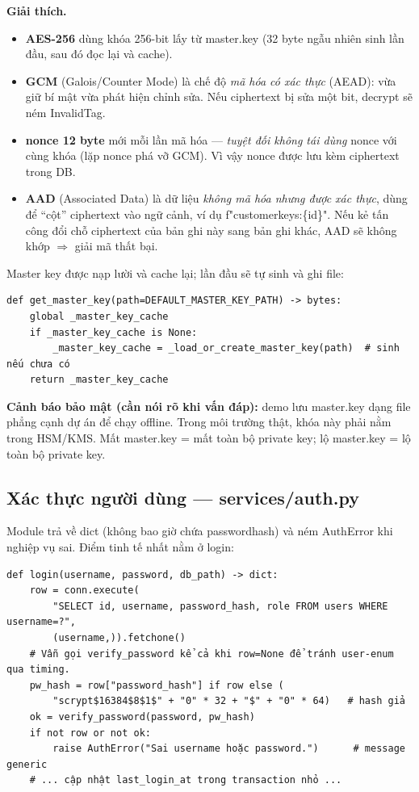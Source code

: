 \documentclass[12pt,a4paper]{article}
\newcommand{\code}[1]{{\ttfamily\small\def\_{\textunderscore\discretionary{}{}{}}#1}}
\begin{document}
\textbf{Giải thích.}
\begin{itemize}
  \item \textbf{AES-256} dùng khóa 256-bit lấy từ \code{master.key} (32 byte ngẫu
        nhiên sinh lần đầu, sau đó đọc lại và cache).
  \item \textbf{GCM} (Galois/Counter Mode) là chế độ \emph{mã hóa có xác thực}
        (AEAD): vừa giữ bí mật vừa phát hiện chỉnh sửa. Nếu ciphertext bị sửa một
        bit, \code{decrypt} sẽ ném \code{InvalidTag}.
  \item \textbf{nonce 12 byte} mới mỗi lần mã hóa — \emph{tuyệt đối không tái dùng}
        nonce với cùng khóa (lặp nonce phá vỡ GCM). Vì vậy nonce được lưu kèm
        ciphertext trong DB.
  \item \textbf{AAD} (Associated Data) là dữ liệu \emph{không mã hóa nhưng được
        xác thực}, dùng để ``cột'' ciphertext vào ngữ cảnh, ví dụ
        \code{f"customer\_keys:\{id\}"}. Nếu kẻ tấn công đổi chỗ ciphertext của
        bản ghi này sang bản ghi khác, AAD sẽ không khớp $\Rightarrow$ giải mã
        thất bại.
\end{itemize}

Master key được nạp lười và cache lại; lần đầu sẽ tự sinh và ghi file:

\begin{Verbatim}
def get_master_key(path=DEFAULT_MASTER_KEY_PATH) -> bytes:
    global _master_key_cache
    if _master_key_cache is None:
        _master_key_cache = _load_or_create_master_key(path)  # sinh nếu chưa có
    return _master_key_cache
\end{Verbatim}

\begin{warnbox}
\textbf{Cảnh báo bảo mật (cần nói rõ khi vấn đáp):} demo lưu \code{master.key}
dạng file phẳng cạnh dự án để chạy offline. Trong môi trường thật, khóa này phải
nằm trong HSM/KMS. Mất \code{master.key} = mất toàn bộ private key; lộ
\code{master.key} = lộ toàn bộ private key.
\end{warnbox}

\subsection{Xác thực người dùng — \code{services/auth.py}}

Module trả về \code{dict} (không bao giờ chứa \code{password\_hash}) và ném
\code{AuthError} khi nghiệp vụ sai. Điểm tinh tế nhất nằm ở \code{login}:

\begin{Verbatim}
def login(username, password, db_path) -> dict:
    row = conn.execute(
        "SELECT id, username, password_hash, role FROM users WHERE username=?",
        (username,)).fetchone()
    # Vẫn gọi verify_password kể cả khi row=None để tránh user-enum qua timing.
    pw_hash = row["password_hash"] if row else (
        "scrypt$16384$8$1$" + "0" * 32 + "$" + "0" * 64)   # hash giả
    ok = verify_password(password, pw_hash)
    if not row or not ok:
        raise AuthError("Sai username hoặc password.")      # message generic
    # ... cập nhật last_login_at trong transaction nhỏ ...
\end{Verbatim}
\end{document}
